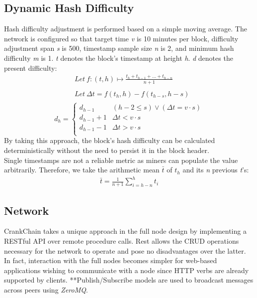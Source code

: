 \documentclass[10pt,twocolumn]{article}
\begin{document}
\subsection{Dynamic Hash Difficulty}
Hash difficulty adjustment is performed based on a simple moving average.  The network is configured so that target time \textit{v} is 10 minutes per block, difficulty adjustment span \textit{s} is 500, timestamp sample size \textit{n} is 2, and minimum hash difficulty \textit{m} is 1.  \textit{t} denotes the block's timestamp at height \textit{h}. \textit{d} denotes the present difficulty:
\begin{align*}
&Let\ {f} : (t,h)\mapsto \frac{t_h + t_{h-1} + \dots + t_{h-n}}{n+1} \\\\
&Let\ \Delta{t} = {f(t_h,h)} - {f(t_{h-s},h-s)}\\
\end{align*}
\[
d_h = 
\begin{cases}
	d_{h-1} & (h-2\leq s) \vee (\Delta{t} = v\cdot s)\\
	d_{h-1} + 1 & \Delta{t}<v\cdot s\\
	d_{h-1} - 1 & \Delta{t}>v\cdot s\\
\end{cases}
\]
By taking this approach, the block's hash difficulty can be calculated deterministically without the need to persist it in the block header.\\
Single timestamps are not a reliable metric as miners can populate the value arbitrarily. Therefore, we take the arithmetic mean $\bar{t}$ of $t_h$ and its \textit{n} previous \textit{t}'s:
\begin{align*}
\bar{t} = \frac{1}{n+1}\sum_{i=h-n}^{h} t_i
\end{align*}
\subsection{Network}
CrankChain takes a unique approach in the full node design by implementing a RESTful API over remote procedure calls.  Rest allows the CRUD operations necessary for the network to operate and pose no disadvantages over the latter.  In fact, interaction with the full nodes becomes simpler for web-based applications wishing to communicate with a node since HTTP verbs are already supported by clients.
**Publish/Subscribe models are used to broadcast messages across peers using \textit{ZeroMQ}.
\end{document}
